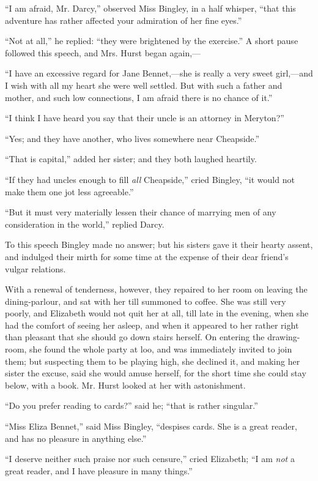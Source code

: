 ``I am afraid, Mr. Darcy,'' observed Miss Bingley, in a half whisper, ``that this adventure has rather affected your admiration of her fine eyes.''

``Not at all,'' he replied: ``they were brightened by the exercise.'' A short pause followed this speech, and Mrs. Hurst began again,---

``I have an excessive regard for Jane Bennet,---she is really a very sweet girl,---and I wish with all my heart she were well settled. But with such a father and mother, and such low connections, I am afraid there is no chance of it.''

``I think I have heard you say that their uncle is an attorney in Meryton?''

``Yes; and they have another, who lives somewhere near Cheapside.''

``That is capital,'' added her sister; and they both laughed heartily.

``If they had uncles enough to fill \textit{all} Cheapside,'' cried Bingley, ``it would not make them one jot less agreeable.''

``But it must very materially lessen their chance of marrying men of any consideration in the world,'' replied Darcy.

To this speech Bingley made no answer; but his sisters gave it their hearty assent, and indulged their mirth for some time at the expense of their dear friend's vulgar relations.

With a renewal of tenderness, however, they repaired to her room on leaving the dining-parlour, and sat with her till summoned to coffee. She was still very poorly, and Elizabeth would not quit her at all, till late in the evening, when she had the comfort of seeing her asleep, and when it appeared to her rather right than pleasant that she should go down stairs herself. On entering the drawing-room, she found the whole party at loo, and was immediately invited to join them; but suspecting them to be playing high, she declined it, and making her sister the excuse, said she would amuse herself, for the short time she could stay below, with a book. Mr. Hurst looked at her with astonishment.

``Do you prefer reading to cards?'' said he; ``that is rather singular.''

``Miss Eliza Bennet,'' said Miss Bingley, ``despises cards. She is a great reader, and has no pleasure in anything else.''

``I deserve neither such praise nor such censure,'' cried Elizabeth; ``I am \textit{not} a great reader, and I have pleasure in many things.''

